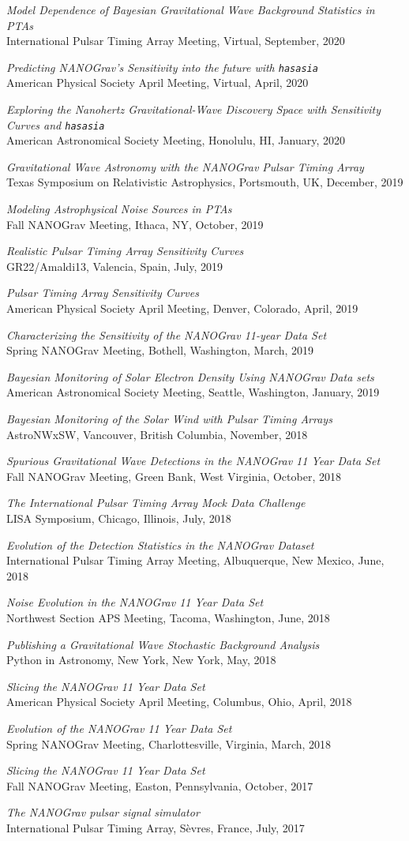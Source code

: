 \documentclass[11pt,letterpaper,sans,unicode]{moderncv}
\newcommand{\talkitem}[3]{\item \textit{#1}\\{#2}, #3} %
\begin{document}
\renewcommand\labelenumi{\bfseries\theenumi .}
\begin{etaremune}[leftmargin=8mm]
\small
\talkitem{Model Dependence of Bayesian Gravitational Wave Background Statistics in PTAs}{International Pulsar Timing Array Meeting}{Virtual, September, 2020}
\talkitem{Predicting NANOGrav's Sensitivity into the future with \texttt{hasasia}}{American Physical Society April Meeting}{Virtual, April, 2020}
\talkitem{Exploring the Nanohertz Gravitational-Wave Discovery Space with Sensitivity Curves and \texttt{hasasia}}{American Astronomical Society Meeting}{Honolulu, HI, January, 2020}
\talkitem{Gravitational Wave Astronomy with the NANOGrav Pulsar Timing Array}{Texas Symposium on Relativistic Astrophysics}{Portsmouth, UK, December, 2019}
\talkitem{Modeling Astrophysical Noise Sources in PTAs}{Fall NANOGrav Meeting}{Ithaca, NY, October, 2019}
\talkitem{Realistic Pulsar Timing Array Sensitivity Curves}{GR22/Amaldi13}{Valencia, Spain, July, 2019}
\talkitem{Pulsar Timing Array Sensitivity Curves}{American Physical Society April Meeting}{Denver, Colorado, April, 2019}
\talkitem{Characterizing the Sensitivity of the NANOGrav 11-year Data Set}{Spring NANOGrav Meeting} Bothell, Washington, March, 2019
\talkitem{Bayesian Monitoring of Solar Electron Density Using NANOGrav Data sets}{American Astronomical Society Meeting}{Seattle, Washington, January, 2019}
\talkitem{Bayesian Monitoring of the Solar Wind with Pulsar Timing Arrays}{AstroNWxSW}{Vancouver, British Columbia, November, 2018}
\talkitem{Spurious Gravitational Wave Detections in the NANOGrav 11 Year Data Set}{Fall NANOGrav Meeting}{Green Bank, West Virginia, October, 2018}
\talkitem{The International Pulsar Timing Array Mock Data Challenge}{LISA Symposium} Chicago, Illinois, July, 2018
\talkitem{Evolution of the Detection Statistics in the NANOGrav Dataset}{International Pulsar Timing Array Meeting}{Albuquerque, New Mexico, June, 2018}
\talkitem{Noise Evolution in the NANOGrav 11 Year Data Set}{Northwest Section APS Meeting}{Tacoma, Washington, June, 2018}
\talkitem{Publishing a Gravitational Wave Stochastic Background Analysis}{Python in Astronomy}{New York, New York, May, 2018}
\talkitem{Slicing the NANOGrav 11 Year Data Set}{American Physical Society April Meeting}{Columbus, Ohio, April, 2018}
\talkitem{Evolution of the NANOGrav 11 Year Data Set}{Spring NANOGrav Meeting}{Charlottesville, Virginia, March, 2018}
\talkitem{Slicing the NANOGrav 11 Year Data Set}{Fall NANOGrav Meeting} Easton, Pennsylvania, October, 2017
\talkitem{The NANOGrav pulsar signal simulator}{International Pulsar Timing Array}{S\`{e}vres, France, July, 2017}

\end{etaremune}
\end{document}
